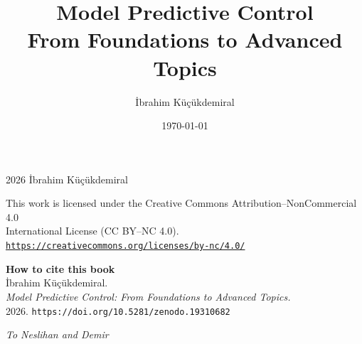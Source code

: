 \documentclass[12pt, a4paper]{book}
\title{\textbf{Model Predictive Control}\\ From Foundations to Advanced Topics}
\author{\.Ibrahim K\"u\c c\"ukdemiral }
\date{\today}
\begin{document}
\raggedbottom
\hypersetup{pageanchor=false}

	\maketitle
	\hypersetup{pageanchor=true}

	\thispagestyle{empty}
	\vspace*{\fill}
	\begin{center}
		\textcopyright{} 2026 \.Ibrahim K\"u\c{c}\"ukdemiral

		\vspace{0.8cm}

		This work is licensed under the Creative Commons Attribution--NonCommercial 4.0\\
		International License (CC BY--NC 4.0).\\[4pt]
		\texttt{\url{https://creativecommons.org/licenses/by-nc/4.0/}}

		\vspace{1.5cm}

		\textbf{How to cite this book}\\[4pt]
		\.Ibrahim K\"u\c{c}\"ukdemiral.\\
		\textit{Model Predictive Control: From Foundations to Advanced Topics.}\\
		2026. \texttt{https://doi.org/10.5281/zenodo.19310682}
	\end{center}
	\vspace*{\fill}
	\cleardoublepage

	\thispagestyle{empty}
	\begin{center}
		\large\itshape
		To Neslihan and Demir
	\end{center}
	\cleardoublepage

	\tableofcontents
	\newpage
	
	\mainmatter
	
	
	
	
	
	
	
	
	
	
	
	
	
	
	\begin{appendices}
		
		
	\end{appendices}

	\backmatter
	
	
\end{document}
